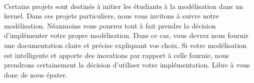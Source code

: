 \documentclass[10pt,a4wide]{article}
\begin{document}
\paragraph{}

Certains projets sont destin\'es \`a initier les \'etudiants \`a la
mod\'elisation dans un kernel. Dans ces projets particuliers, nous
vous invitons \`a suivre notre mod\'elisation. N\'eanmoins vous
pourrez tout \`a fait prendre la d\'ecision d'impl\'ementer votre
propre mod\'elisation. Dans ce cas, vous devrez nous fournir une documentation
claire et pr\'ecise expliquant vos choix. Si votre mod\'elisation est
intelligente et apporte des inovations par rapport \`a celle fournie,
nous prendrons certainement la d\'ecision d'utiliser votre impl\'ementation.
Libre \`a vous donc de nous \'epater.
\end{document}
